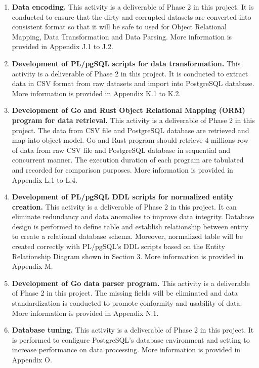 \begin{enumerate}[topsep=0pt,itemsep=-1ex,partopsep=1ex,parsep=1.5ex]
	
	\item \textbf{Data encoding.}
	This activity is a deliverable of Phase 2 in this project. It is conducted to ensure that the dirty and corrupted datasets are converted into consistent format so that it will be safe to used for Object Relational Mapping, Data Transformation and Data Parsing. More information is provided in Appendix J.1 to J.2. 
	
	\item \textbf{Development of PL/pgSQL scripts for data transformation.} 
	This activity is a deliverable of Phase 2 in this project. It is conducted to extract data in CSV format from raw datasets and import into PostgreSQL database. More information is provided in Appendix K.1 to K.2.
	
	\item \textbf{Development of Go and Rust Object Relational Mapping (ORM) program for data retrieval.}
	This activity is a deliverable of Phase 2 in this project. The data from CSV file and PostgreSQL database are retrieved and map into object model. Go and Rust program should retrieve 4 millions row of data from raw CSV file and PostgreSQL database in sequential and concurrent manner. The execution duration of each program are tabulated and recorded for comparison purposes. 
	More information is provided in Appendix L.1 to L.4.
	
	\item \textbf{Development of PL/pgSQL DDL scripts for normalized entity creation.}
	This activity is a deliverable of Phase 2 in this project. It can eliminate redundancy and data anomalies to improve data integrity. Database design is performed to define table and establish relationship between entity to create a relational database schema. Moreover, normalized table will be created correctly with PL/pgSQL's DDL scripts based on the Entity Relationship Diagram shown in Section 3. More information is provided in Appendix M.
	
	\item \textbf{Development of Go data parser program.}
	This activity is a deliverable of Phase 2 in this project. The missing fields will be eliminated and data standardization is conducted to promote conformity and usability of data. More information is provided in Appendix N.1.
	
	\item \textbf{Database tuning.}
	This activity is a deliverable of Phase 2 in this project. It is performed to configure PostgreSQL's database environment and setting to increase performance on data processing. More information is provided in Appendix O.
	

\end{enumerate}
